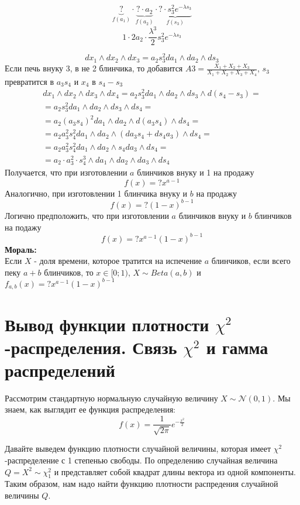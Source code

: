 \documentclass[12pt]{article} %
\theoremstyle{definition} %
\def \cN{\mathcal{N}}
\def \cChi{\mathcal{\chi}}
\begin{document}
    \[
       \underbrace{?}_{f(a_1)}  \cdot  \underbrace{? \cdot a_2}_{f(a_2)} \cdot  \underbrace{? \cdot s_3^2 e^{- \lambda s_3}}_{f(s_3)}
    \]
    \[
        1 \cdot 2a_2 \cdot \frac{\lambda^3}{2} s_3^2 e^{- \lambda s_3}
    \]
    
    \[
        dx_1 \wedge dx_2 \wedge dx_3 = a_2 s_3^2 da_1 \wedge da_2 \wedge ds_3
    \]
    Если печь внуку 3, в не 2 блинчика, то добавится $A3 = \frac{X_1 + X_2 + X_3}{X_1 + X_2 + X_3 + X_4}$, 
     $s_3$ превратится в $a_3 s_4$ и $x_4$ в $s_4 - s_3$
    \begin{eqnarray*}
        dx_1 \wedge dx_2 \wedge dx_3 \wedge dx_4 = a_2 s_3^2 da_1 \wedge da_2 \wedge ds_3 \wedge d(s_4 - s_3) = \\
        = a_2 s_3^2 da_1 \wedge da_2 \wedge ds_3 \wedge ds_4 = \\
        = a_2(a_3 s_4)^2 da_1 \wedge da_2 \wedge d(a_3 s_4) \wedge ds_4 = \\
        = a_2 a_3^2 s_4^2 da_1 \wedge da_2 \wedge (da_3 s_4 + ds_4 a_3) \wedge ds_4 = \\
        = a_2 a_3^2 s_4^2 da_1 \wedge da_2 \wedge s_4 da_3 \wedge ds_4 = \\
        = a_2 \cdot a_3^2 \cdot s_4^3 \wedge da_1 \wedge da_2 \wedge da_3 \wedge ds_4
    \end{eqnarray*}
    Получается, что при изготовлении $a$ блинчиков внуку и 1 на продажу
    \[
        f(x) = ? x^{a-1}
    \]
    Аналогично, при изготовлении 1 блинчика внуку и $b$ на продажу
    \[
        f(x) = ? (1 - x)^{b-1}
    \]
    Логично предположить, что при изготовлении $a$ блинчиков внуку и $b$ блинчиков на подажу
    \[
        f(x) = ? x^{a-1} (1 - x)^{b-1}
    \]
    \textbf{Мораль:}\\
    Если $X$ - доля времени, которое тратится на испечение $a$ блинчиков, если всего пеку $a + b$ блинчиков, то $x \in [0;1)$, $X \sim Beta(a, b)$ и $f_{a,b}(x) = ? x^{a-1} (1 - x)^{b-1}$
    
    
    \section{Вывод функции плотности $\chi^2$-распределения. Связь $\chi^2$ и гамма распределений}

Рассмотрим стандартную нормальную случайную величину $X \sim \cN(0, 1)$. Мы знаем, как выглядит ее функция распределения:
    \[
        f(x)=\frac{1}{\sqrt{2\pi}}e^{-\frac{x^2}{2}}
    \]
    
Давайте выведем функцию плотности случайной величины, которая имеет $\chi^2$-распределение с 1 степенью свободы.
По определению случайная величина $Q=X^2 \sim \cChi_1^2$ и представляет собой квадрат длины вектора из одной компоненты. Таким образом, нам надо найти функцию плотности распредения случайной величины $Q$.
\end{document}
